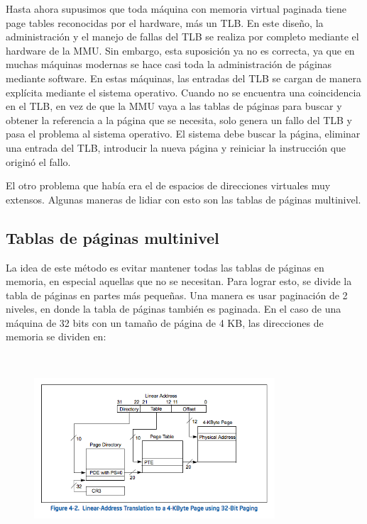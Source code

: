 Hasta ahora supusimos que toda máquina con memoria virtual paginada tiene page tables reconocidas por el hardware, más un TLB. En este diseño, la administración y el manejo de fallas del TLB se realiza por completo mediante el hardware de la MMU. Sin embargo, esta suposición ya no es correcta, ya que en muchas máquinas modernas se hace casi toda la administración de páginas mediante software. En estas máquinas, las entradas del TLB se cargan de manera explícita mediante el sistema operativo. Cuando no se encuentra una coincidencia en el TLB, en vez de que la MMU vaya a las tablas de páginas para buscar y obtener la referencia a la página que se necesita, solo genera un fallo del TLB y pasa el problema al sistema operativo. El sistema debe buscar la página, eliminar una entrada del TLB, introducir la nueva página y reiniciar la instrucción que originó el fallo.

El otro problema que había era el de espacios de direcciones virtuales muy extensos. Algunas maneras de lidiar con esto son las tablas de páginas multinivel.


\subsection{Tablas de páginas multinivel}

La idea de este método es evitar mantener todas las tablas de páginas en memoria, en especial aquellas que no se necesitan. Para lograr esto, se divide la tabla de páginas en partes más pequeñas. Una manera es usar paginación de 2 niveles, en donde la tabla de páginas también es paginada. En el caso de una máquina de 32 bits con un tamaño de página de 4 KB, las direcciones de memoria se dividen en:

~\\

\begin{figure}[h]
	\begin{center}
	\includegraphics[width=0.8\textwidth]{imagenes/32-bit-4k-paging.png}
	\end{center}
\end{figure}

